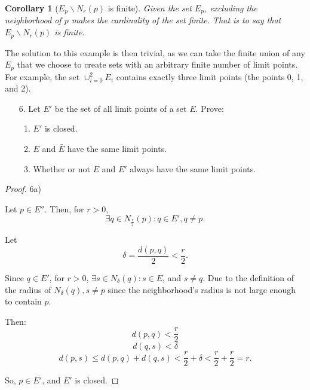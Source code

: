 \documentclass[10pt]{article}
\theoremstyle{definition}
\theoremstyle{plain}
\newtheorem*{corollary*}{Corollary}
\begin{document}
\begin{corollary*}[$E_p\backslash N_r(p)$ is finite]
Given the set $E_p$, excluding the neighborhood of $p$ makes the cardinality of the set finite. That is to say that $E_p\backslash N_r(p)$ is finite.
\end{corollary*}

The solution to this example is then trivial, as we can take the finite union of any $E_p$ that we choose to create sets with an arbitrary finite number of limit points. For example, the set $\cup^2_{i=0} E_i$ contains exactly three limit points (the points 0, 1, and 2).


\pagebreak



\begin{enumerate}
\item[6.] Let $E'$ be the set of all limit points of a set $E$. Prove:
\begin{enumerate}
  \item $E'$ is closed.
  \item $E$ and $\bar{E}$ have the same limit points.
  \item Whether or not $E$ and $E'$ always have the same limit points.
\end{enumerate}
\end{enumerate}

\begin{proof}
6a)

Let $p\in E''$. Then, for $r>0$,
$$\exists q\in N_{\frac{r}{2}} (p):q\in E', q\neq p.$$

Let
$$\delta = \frac{d(p,q)}{2} < \frac{r}{2}.$$

Since $q\in E'$, for $r>0$, $\exists s\in N_\delta (q): s\in E$, and  $s\neq q$. Due to the definition of the radius of $N_\delta (q), s\neq p$ since the neighborhood's radius is not large enough to contain $p$.

Then:
$$d(p,q) < \frac{r}{2}$$
$$d(q,s) < \delta$$
$$d(p,s) \leq d(p,q) + d(q,s) < \frac{r}{2} + \delta < \frac{r}{2} + \frac{r}{2} = r.$$

So, $p\in E'$, and $E'$ is closed.
\end{proof}
\end{document}
